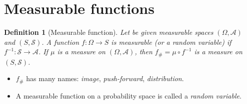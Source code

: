 \documentclass[12pt,a4paper]{amsart}
\theoremstyle{plain}
\newtheorem{definition}[theorem]{Definition}%
\theoremstyle{definition}
\theoremstyle{remark}
\begin{document}
\section{Measurable functions}
\label{sec:measurable-functions}

\begin{definition}[Measurable function]
  Let be given measurable spaces $(\Omega,\mathcal A)$ and
  $(S,\mathcal S)$. A function $f \colon \Omega \to S$ is \emph{measurable}
  (or a \emph{random variable}) if $f^{-1} \colon \mathcal S \to
  \mathcal A$. If $\mu$ is a measure on $(\Omega,\mathcal A)$, then
  $f_\# = \mu \circ f^{-1}$ is a measure on $(S,\mathcal S)$.
\end{definition}

\begin{itemize}
\item $f_\#$ has many names: \emph{image}, \emph{push-forward},   \emph{distribution}.
\item A measurable function on a probability space is called a
  \emph{random variable}.
\end{itemize}
\end{document}
